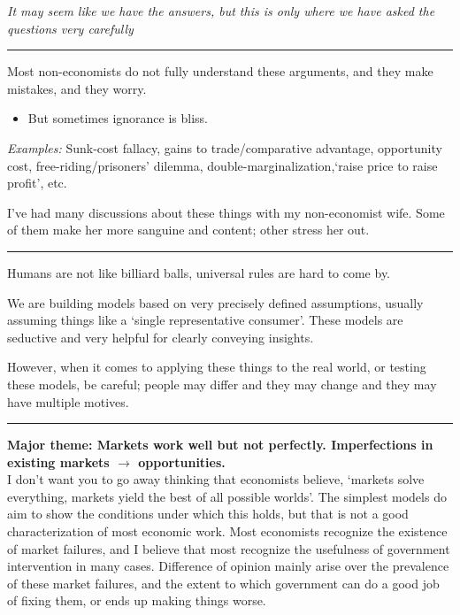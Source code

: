 \documentclass[]{article}
\providecommand{\tightlist}{%
  \setlength{\itemsep}{0pt}\setlength{\parskip}{0pt}}
\begin{document}
\emph{It may seem like we have the answers, but this is only where we have asked the questions very carefully}

\begin{center}\rule{0.5\linewidth}{\linethickness}\end{center}

\textrm{Most non-economists do not fully understand these arguments, and they make mistakes, and they worry.}

\begin{itemize}
\tightlist
\item
  But sometimes ignorance is bliss.
\end{itemize}

\emph{Examples:} Sunk-cost fallacy, gains to trade/comparative advantage, opportunity cost,
free-riding/prisoners' dilemma, double-marginalization,`raise price to raise profit', etc.

I've had many discussions about these things with my non-economist wife. Some of them make her more sanguine and content; other stress her out.

\begin{center}\rule{0.5\linewidth}{\linethickness}\end{center}

\textrm{Humans are not like billiard balls, universal rules are hard to come by.}

We are building models based on very precisely defined assumptions, usually assuming things like a `single representative consumer'. These models are seductive and very helpful for clearly conveying insights.

However, when it comes to applying these things to the real world, or testing these models, be careful; people may differ and they may change and they may have multiple motives.

\begin{center}\rule{0.5\linewidth}{\linethickness}\end{center}

\textbf{Major theme: Markets work well but not perfectly. Imperfections in existing markets \(\rightarrow\) opportunities.}\\

I don't want you to go away thinking that economists believe, `markets solve everything, markets yield the best of all possible worlds'. The simplest models do aim to show the conditions under which this holds, but that is not a good characterization of most economic work. Most economists recognize the existence of market failures, and I believe that most recognize the usefulness of government intervention in many cases. Difference of opinion mainly arise over the prevalence of these market failures, and the extent to which government can do a good job of fixing them, or ends up making things worse.
\end{document}

